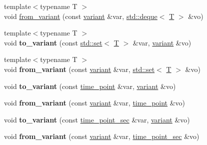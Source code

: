 \begin{DoxyCompactItemize}
\item 
{\footnotesize template$<$typename T $>$ }\\void \mbox{\hyperlink{namespacefc_abaf96fc2899be6615ce66c2863c84490}{from\+\_\+variant}} (const \mbox{\hyperlink{classfc_1_1variant}{variant}} \&var, \mbox{\hyperlink{classstd_1_1deque}{std\+::deque}}$<$ \mbox{\hyperlink{struct_t}{T}} $>$ \&vo)
\item 
\mbox{\label{namespacefc_a5bbdb78f6760d0a8f95455c552752774}} 
{\footnotesize template$<$typename T $>$ }\\void {\bfseries to\+\_\+variant} (const \mbox{\hyperlink{classstd_1_1set}{std\+::set}}$<$ \mbox{\hyperlink{struct_t}{T}} $>$ \&var, \mbox{\hyperlink{classfc_1_1variant}{variant}} \&vo)
\item 
\mbox{\label{namespacefc_aae4efdaf7c73609802bfc122515103fe}} 
{\footnotesize template$<$typename T $>$ }\\void {\bfseries from\+\_\+variant} (const \mbox{\hyperlink{classfc_1_1variant}{variant}} \&var, \mbox{\hyperlink{classstd_1_1set}{std\+::set}}$<$ \mbox{\hyperlink{struct_t}{T}} $>$ \&vo)
\item 
\mbox{\label{namespacefc_a005531de5c3d8a3519b86069f81b8684}} 
void {\bfseries to\+\_\+variant} (const \mbox{\hyperlink{classfc_1_1time__point}{time\+\_\+point}} \&var, \mbox{\hyperlink{classfc_1_1variant}{variant}} \&vo)
\item 
\mbox{\label{namespacefc_a5c3ecfeb574ebda3e305341c7437f749}} 
void {\bfseries from\+\_\+variant} (const \mbox{\hyperlink{classfc_1_1variant}{variant}} \&var, \mbox{\hyperlink{classfc_1_1time__point}{time\+\_\+point}} \&vo)
\item 
\mbox{\label{namespacefc_a63492dba1eecd6ffb40d9a6ffa197734}} 
void {\bfseries to\+\_\+variant} (const \mbox{\hyperlink{classfc_1_1time__point__sec}{time\+\_\+point\+\_\+sec}} \&var, \mbox{\hyperlink{classfc_1_1variant}{variant}} \&vo)
\item 
\mbox{\label{namespacefc_aa89818feb929d4397020f182439e471a}} 
void {\bfseries from\+\_\+variant} (const \mbox{\hyperlink{classfc_1_1variant}{variant}} \&var, \mbox{\hyperlink{classfc_1_1time__point__sec}{time\+\_\+point\+\_\+sec}} \&vo)
\item 

\end{DoxyCompactItemize}
